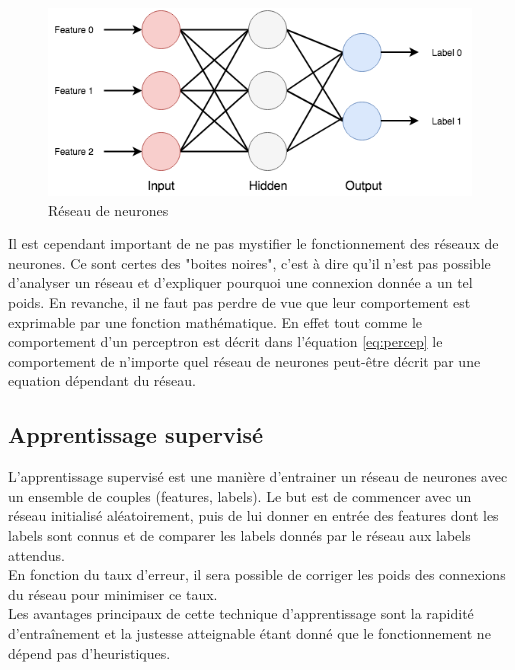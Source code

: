 \documentclass{article}
\begin{document}
\begin{figure}[H]
\begin{center}
	\includegraphics[scale=0.7]{ff.png}
	\caption{Réseau de neurones}
\end{center}
\end{figure}
 
 Il est cependant important de ne pas mystifier le fonctionnement des réseaux de neurones. Ce sont certes des "boites noires", c'est à dire qu'il n'est pas possible d'analyser un réseau et d'expliquer pourquoi une connexion donnée a un tel poids. En revanche, il ne faut pas perdre de vue que leur comportement est exprimable par une fonction mathématique. En effet tout comme le comportement d'un perceptron est décrit dans l'équation \ref{eq:percep} le comportement de n'importe quel réseau de neurones peut-être décrit par une equation dépendant du réseau.

\subsection{Apprentissage supervisé}

L'apprentissage supervisé est une manière d'entrainer un réseau de neurones avec un ensemble de couples (features, labels). Le but est de commencer avec un réseau initialisé aléatoirement, puis de lui donner en entrée des features dont les labels sont connus et de comparer les labels donnés par le réseau aux labels attendus.\\
En fonction du taux d'erreur, il sera possible de corriger les poids des connexions du réseau pour minimiser ce taux\cite{wikisupervised}.\\

Les avantages principaux de cette technique d'apprentissage sont la rapidité d'entraînement et la justesse atteignable étant donné que le fonctionnement ne dépend pas d'heuristiques.\\
\end{document}
